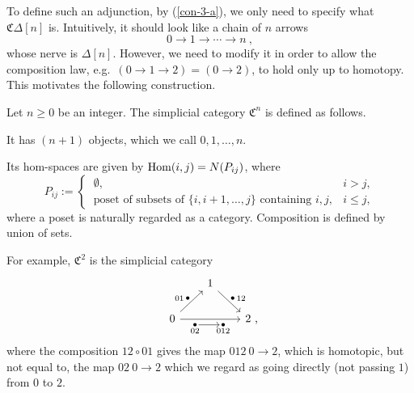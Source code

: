 To define such an adjunction, by (\ref{con-3-a}),
we only need to specify what $\mathfrak C\Delta[n]$ is.
Intuitively, it should look like a chain of $n$ arrows
\[0\to1\to\cdots\to n\ ,\]
whose nerve is $\Delta[n]$.
However, we need to modify it in order to allow 
the composition law, e.g.\ $(0\to1\to2)=(0\to2)$,
to hold only up to homotopy. This motivates the following construction.

\begin{construction}
    Let $n\geq0$ be an integer. The simplicial category $\mathfrak C^n$ is defined as follows.
    \begin{itms}
        \item It has $(n+1)$ objects, which we call $0,1,\dotsc,n$.
        \item Its hom-spaces are given by $\operatorname{Hom}(i,j)=N(P_{ij})$, where 
        \[P_{ij}:=\begin{cases}
            \ \emptyset, & i>j,\\
            \ \text{poset of subsets of $\{i,i+1,\dotsc,j\}$ containing $i,j$}, & i\leq j,
        \end{cases}\]
        where a poset is naturally regarded as a category.
        Composition is defined by union of sets. \varqed
    \end{itms}
\end{construction}

For example, $\mathfrak C^2$ is the simplicial category 
\[\begin{tikzcd}[column sep=2em]
    & 1 \arrow{dr}[inner sep=0pt]{
    \begin{tikzpicture}[every node/.style={inner sep=1pt},
                        every label/.style={inner sep=0pt}]
        \node[label=right:12]{\bullet};
    \end{tikzpicture}} \\
    0 \arrow{ur}[inner sep=0pt]{
    \begin{tikzpicture}[every node/.style={inner sep=1pt},
                        every label/.style={inner sep=0pt}]
        \node[label=left:01]{\bullet};
    \end{tikzpicture}}
    \arrow{rr}[swap]{
    \begin{tikzpicture}[node distance=2.5em,
                        every node/.style={inner sep=1pt},
                        every label/.style={inner sep=0pt}]
        \node(02)[label=below:02]{\bullet}; 
        \node(012)[right of=02,label=below:012]{\bullet};
        \draw[->](02)--(012);
    \end{tikzpicture}}
    && 2\rlap{\ ,}
\end{tikzcd}\]
where the composition $12\circ01$ gives the map $012\:0\to2$,
which is homotopic, but not equal to, the map $02\:0\to2$
which we regard as going directly (not passing $1$) from $0$ to $2$.


